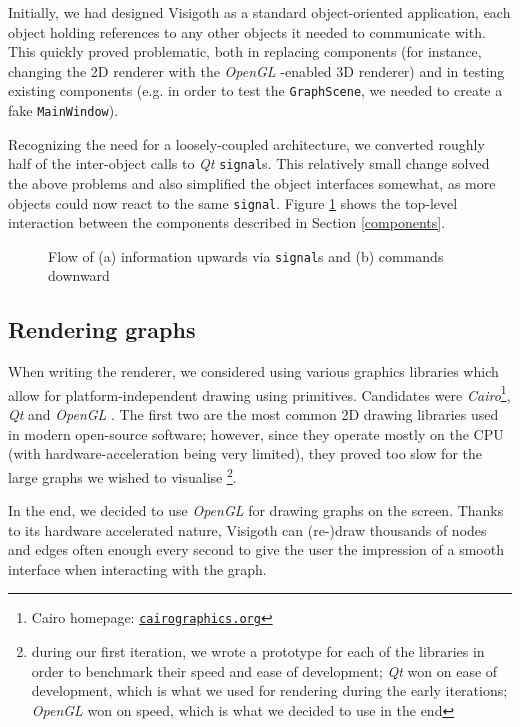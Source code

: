 \documentclass[a4paper,11pt,titlepage]{article}
\let\stdhref\href
\renewcommand{\href}[2]{\stdhref{#1}{\texttt{#2}}}
\newcommand{\code}[1]{\texttt{#1}}
\newcommand{\buzz}[1]{\emph{#1}}
\newcommand{\Qt}{\buzz{Qt} }
\newcommand{\OpenGL}{\buzz{OpenGL} }
\begin{document}
Initially, we had designed Visigoth as a standard object-oriented
application, each object holding references to any other objects it
needed to communicate with. This quickly proved problematic, both in
replacing components (for instance, changing the 2D renderer with the
\OpenGL-enabled 3D renderer) and in testing existing components
(e.g. in order to test the \code{GraphScene}, we needed to create a
fake \code{MainWindow}).

Recognizing the need for a loosely-coupled architecture, we converted
roughly half of the inter-object calls to \Qt \code{signal}s. This
relatively small change solved the above problems and also simplified
the object interfaces somewhat, as more objects could now react to the
same \code{signal}. Figure \ref{fig:interaction} shows the top-level
interaction between the components described in Section
\ref{components}.

\begin{figure}[ht]
  \centering
  
  \caption{Flow of (a) information upwards via \code{signal}s and (b)
    commands downward}
  \label{fig:interaction}
\end{figure}

\subsection{Rendering graphs}

When writing the renderer, we considered using various graphics
libraries which allow for platform-independent drawing using
primitives. Candidates were \buzz{Cairo}\footnote{Cairo homepage:
  \href{http://cairographics.org/}{cairographics.org}}, \Qt and
\OpenGL. The first two are the most common 2D drawing libraries used
in modern open-source software; however, since they operate mostly on
the CPU (with hardware-acceleration being very limited), they proved
too slow for the large graphs we wished to visualise \footnote{during
  our first iteration, we wrote a prototype for each of the libraries
  in order to benchmark their speed and ease of development; \Qt won
  on ease of development, which is what we used for rendering during
  the early iterations; \OpenGL won on speed, which is what we decided
  to use in the end}.

In the end, we decided to use \OpenGL for drawing graphs on the
screen. Thanks to its hardware accelerated nature, Visigoth can
(re-)draw thousands of nodes and edges often enough every second to
give the user the impression of a smooth interface when interacting
with the graph.
\end{document}
